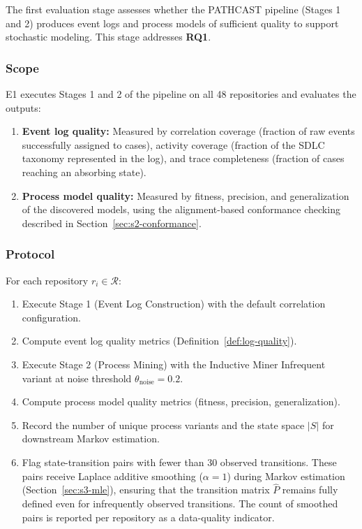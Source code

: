 The first evaluation stage assesses whether the PATHCAST pipeline 
(Stages 1 and 2) produces event logs and process models of sufficient 
quality to support stochastic modeling. This stage addresses \textbf{RQ1}.

\subsubsection{Scope}

E1 executes Stages 1 and 2 of the pipeline on all 48 repositories 
and evaluates the outputs:

\begin{enumerate}
    \item \textbf{Event log quality:} Measured by correlation coverage 
    (fraction of raw events successfully assigned to cases), activity 
    coverage (fraction of the SDLC taxonomy represented in the log), 
    and trace completeness (fraction of cases reaching an absorbing 
    state).
    
    \item \textbf{Process model quality:} Measured by fitness, precision, 
    and generalization of the discovered models, using the alignment-based 
    conformance checking described in Section~\ref{sec:s2-conformance}.
\end{enumerate}

\subsubsection{Protocol}

For each repository $r_i \in \mathcal{R}$:

\begin{enumerate}
    \item Execute Stage 1 (Event Log Construction) with the default 
    correlation configuration.
    
    \item Compute event log quality metrics 
    (Definition~\ref{def:log-quality}).
    
    \item Execute Stage 2 (Process Mining) with the Inductive Miner 
    Infrequent variant at noise threshold $\theta_{\text{noise}} = 0.2$.
    
    \item Compute process model quality metrics (fitness, precision, 
    generalization).
    
    \item Record the number of unique process variants and the state
    space $|S|$ for downstream Markov estimation.

    \item Flag state-transition pairs with fewer than 30 observed
    transitions. These pairs receive Laplace additive smoothing
    ($\alpha = 1$) during Markov estimation
    (Section~\ref{sec:s3-mle}), ensuring that the transition
    matrix $\hat{P}$ remains fully defined even for infrequently
    observed transitions. The count of smoothed pairs is reported
    per repository as a data-quality indicator.
\end{enumerate}

